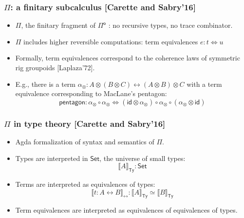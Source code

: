 \documentclass[12pt,t]{beamer}
\newcommand{\Pio}{\ensuremath{\mathsf{\Pi}^{\mathsf{o}}}}
\newcommand{\Set}{\mathsf{Set}}
\newcommand{\id}{\mathsf{id}}
\newcommand{\lr}{\longleftrightarrow}
\newcommand{\LR}{\iff}
\newcommand{\semTy}[1]{{\llbracket #1 \rrbracket}_\mathsf{Ty}}
\newcommand{\semTm}[1]{{\llbracket #1 \rrbracket}_{\lr}}
\begin{document}
\begin{frame}

  \frametitle{$\Pi$: a finitary subcalculus [Carette and Sabry'16]}

  \begin{itemize}

  \item $\Pi$, the finitary fragment of $\Pio$ : no recursive types,
    no trace combinator.

  \item $\Pi$ includes higher reversible computations: term
    equivalences $e : t \LR u$
  \item Formally, term equivalences correspond to the coherence laws of
    symmetric rig groupoids [Laplaza'72].
  \item E.g., there is a term $\alpha_{\otimes} : A \otimes (B \otimes
    C) \lr (A \otimes B) \otimes C$ with a term equivalence
    corresponding to MacLane's pentagon:
    \[
    \mathsf{pentagon} : \alpha_{\otimes} \circ \alpha_{\otimes} \LR (\id \otimes
    \alpha_{\otimes}) \circ \alpha_{\otimes} \circ (\alpha_{\otimes}
    \otimes \id)
    \]
    
  \end{itemize}
  
\end{frame}

\begin{frame}
  \frametitle{$\Pi$ in type theory [Carette and Sabry'16]}

  \begin{itemize}

  \item Agda formalization of syntax and
    semantics of $\Pi$.
  \item Types are interpreted in $\Set$, the universe of small types:
    \[
    \semTy A : \Set
    \]
  \item Terms are interpreted as equivalences of types:
    \[
    \semTm {t : A \lr B} : \semTy A \simeq \semTy B
    \]
  \item Term equivalences are interpreted as equivalences of
    equivalences of types.
  \end{itemize}
  
  
\end{frame}
\end{document}
